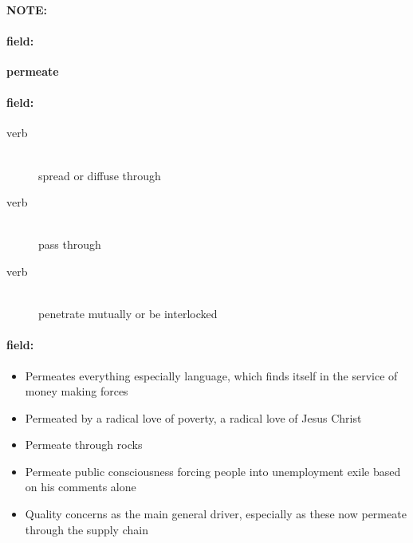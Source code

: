 \documentclass[12pt]{article}
\newenvironment{note}{\paragraph{NOTE:}}{}
\newenvironment{field}{\paragraph{field:}}{}
\begin{document}
\begin{note}
\begin{field}
\textbf{\large permeate}
\end{field}


\begin{field}
\begin{description}
\item[verb] \hfill \\ 
spread or diffuse through

\item[verb] \hfill \\ 
pass through

\item[verb] \hfill \\ 
penetrate mutually or be interlocked

\end{description}
\end{field}

\begin{field}
\begin{itemize}
\item Permeates everything especially language, which finds itself in the service of money making forces
\item Permeated by a radical love of poverty, a radical love of Jesus Christ
\item Permeate through rocks
\item Permeate public consciousness forcing people into unemployment exile based on his comments alone
\item Quality concerns as the main general driver, especially as these now permeate through the supply chain
\end{itemize}
\end{field}
\end{note}
\end{document}
